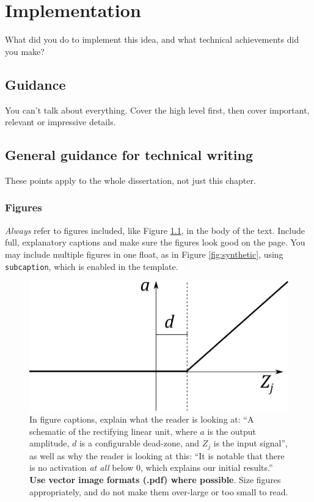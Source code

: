 \documentclass{l4proj}
\begin{document}
\chapter{Implementation}
What did you do to implement this idea, and what technical achievements did you make?
\section{Guidance}
You can't talk about everything. Cover the high level first, then cover important, relevant or impressive details.

\section{General guidance for technical writing}

These points apply to the whole dissertation, not just this chapter.

\subsection{Figures}
\emph{Always} refer to figures included, like Figure \ref{fig:relu}, in the body of the text. Include full, explanatory captions and make sure the figures look good on the page.
You may include multiple figures in one float, as in Figure \ref{fig:synthetic}, using \texttt{subcaption}, which is enabled in the template.


\begin{figure}[htb]
    \centering
    \includegraphics[width=0.5\linewidth]{images/relu.pdf}    

    \caption{In figure captions, explain what the reader is looking at: ``A schematic of the rectifying linear unit, where $a$ is the output amplitude,
    $d$ is a configurable dead-zone, and $Z_j$ is the input signal'', as well as why the reader is looking at this: 
    ``It is notable that there is no activation \emph{at all} below 0, which explains our initial results.'' 
    \textbf{Use vector image formats (.pdf) where possible}. Size figures appropriately, and do not make them over-large or too small to read.
    }

    \label{fig:relu} 
\end{figure}
\end{document}
